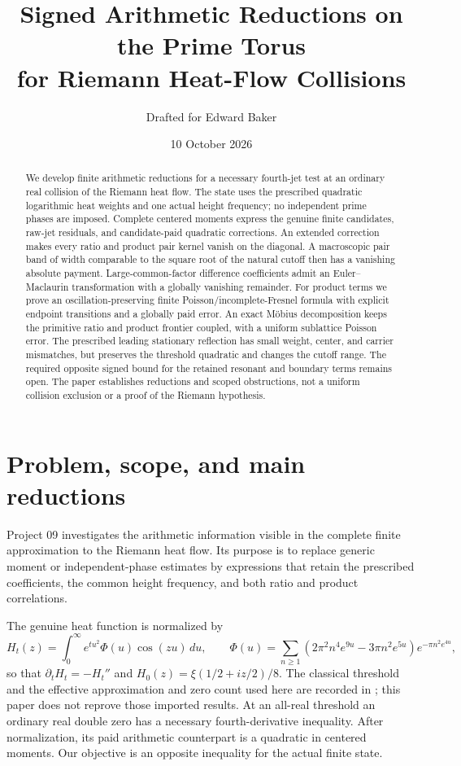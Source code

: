 \documentclass[11pt]{article}
\title{Signed Arithmetic Reductions on the Prime Torus\\
for Riemann Heat-Flow Collisions}
\author{Drafted for Edward Baker}
\date{10 October 2026}
\numberwithin{equation}{section}
\theoremstyle{definition}
\theoremstyle{remark}
\newcommand{\dd}{\,d}
\begin{document}
\maketitle
\begin{abstract}
We develop finite arithmetic reductions for a necessary fourth-jet test at
an ordinary real collision of the Riemann heat flow. The state uses the
prescribed quadratic logarithmic heat weights and one actual height
frequency; no independent prime phases are imposed. Complete centered
moments express the genuine finite candidates, raw-jet residuals, and
candidate-paid quadratic corrections. An extended correction makes every
ratio and product pair kernel vanish on the diagonal. A macroscopic pair
band of width comparable to the square root of the natural cutoff then has
a vanishing absolute payment. Large-common-factor difference coefficients
admit an Euler--Maclaurin transformation with a globally vanishing remainder.
For product terms we prove an oscillation-preserving finite
Poisson/incomplete-Fresnel formula with explicit endpoint transitions and
a globally paid error. An exact M\"obius decomposition keeps the primitive
ratio and product frontier coupled, with a uniform sublattice Poisson error.
The prescribed leading stationary reflection has small weight, center,
and carrier mismatches, but preserves the threshold quadratic and changes
the cutoff range. The required opposite signed bound for the retained
resonant and boundary terms remains open. The paper establishes reductions
and scoped obstructions, not a uniform collision exclusion or a proof of
the Riemann hypothesis.
\end{abstract}
\tableofcontents

\section{Problem, scope, and main reductions}
\label{sec:intro}
Project 09 investigates the arithmetic information visible in the complete
finite approximation to the Riemann heat flow. Its purpose is to replace
generic moment or independent-phase estimates by expressions that retain
the prescribed coefficients, the common height frequency, and both
ratio and product correlations.

The genuine heat function is normalized by
\[
H_t(z)=\int_0^\infty e^{tu^2}\Phi(u)\cos(zu)\dd u,
\qquad
\Phi(u)=\sum_{n\ge1}(2\pi^2n^4e^{9u}-3\pi n^2e^{5u})
                           e^{-\pi n^2e^{4u}},
\]
so that $\partial_tH_t=-H_t''$ and
$H_0(z)=\xi(1/2+iz/2)/8$. The classical threshold and the effective
approximation and zero count used here are recorded in
\cite{polymath}; this paper does not reprove those imported results.
At an all-real threshold an ordinary real double zero has a necessary
fourth-derivative inequality. After normalization, its paid arithmetic
counterpart is a quadratic in centered moments.
Our objective is an opposite inequality for the actual finite state.
\end{document}
